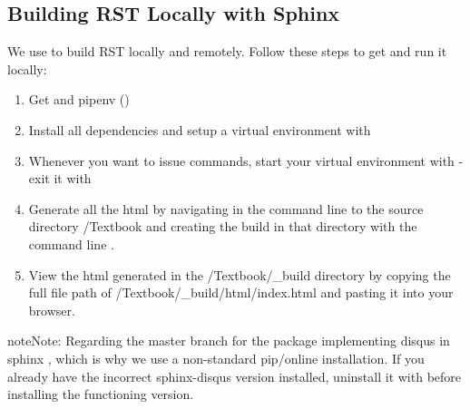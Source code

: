 \documentclass[letterpaper,10pt,english]{sphinxmanual}
\begin{document}
\subsection{Building RST Locally with Sphinx}
\label{\detokenize{Textbook_Creation_Help/rst_intro:building-rst-locally-with-sphinx}}\label{\detokenize{Textbook_Creation_Help/rst_intro:heading-building-rst-locally}}
We use  to build RST locally and remotely. Follow these steps to get  and run it locally:
\begin{enumerate}
\item {} 
Get  and pipenv ()

\item {} 
Install all dependencies and setup a virtual environment with 

\item {} 
Whenever you want to issue commands, start your virtual environment with  - exit it with 

\item {} 
Generate all the html by navigating in the command line to the source directory /Textbook and creating the build in that directory with the command line .

\item {} 
View the html generated in the /Textbook/\_build directory by copying the full file path of /Textbook/\_build/html/index.html and pasting it into your browser.

\end{enumerate}

\begin{sphinxadmonition}{note}{Note:}
Regarding  the master branch for the package implementing disqus in sphinx , which is why we use a non-standard pip/online installation. If you already have the incorrect sphinx-disqus version installed, uninstall it with  before installing the functioning version.
\end{sphinxadmonition}
\end{document}
